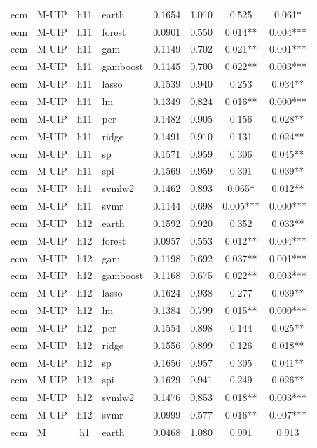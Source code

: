 \begin{ThreePartTable}
\begin{longtable}[t]{llclcccc}
\addlinespace
ecm & M-UIP & h11 & earth & 0.1654 & 1.010 & 0.525 & 0.061*\\
ecm & M-UIP & h11 & forest & 0.0901 & 0.550 & 0.014** & 0.004***\\
ecm & M-UIP & h11 & gam & 0.1149 & 0.702 & 0.021** & 0.001***\\
ecm & M-UIP & h11 & gamboost & 0.1145 & 0.700 & 0.022** & 0.003***\\
ecm & M-UIP & h11 & lasso & 0.1539 & 0.940 & 0.253 & 0.034**\\
ecm & M-UIP & h11 & lm & 0.1349 & 0.824 & 0.016** & 0.000***\\
ecm & M-UIP & h11 & pcr & 0.1482 & 0.905 & 0.156 & 0.028**\\
ecm & M-UIP & h11 & ridge & 0.1491 & 0.910 & 0.131 & 0.024**\\
ecm & M-UIP & h11 & sp & 0.1571 & 0.959 & 0.306 & 0.045**\\
ecm & M-UIP & h11 & spi & 0.1569 & 0.959 & 0.301 & 0.039**\\
ecm & M-UIP & h11 & svmlw2 & 0.1462 & 0.893 & 0.065* & 0.012**\\
ecm & M-UIP & h11 & svmr & 0.1144 & 0.698 & 0.005*** & 0.000***\\
\addlinespace
ecm & M-UIP & h12 & earth & 0.1592 & 0.920 & 0.352 & 0.033**\\
ecm & M-UIP & h12 & forest & 0.0957 & 0.553 & 0.012** & 0.004***\\
ecm & M-UIP & h12 & gam & 0.1198 & 0.692 & 0.037** & 0.001***\\
ecm & M-UIP & h12 & gamboost & 0.1168 & 0.675 & 0.022** & 0.003***\\
ecm & M-UIP & h12 & lasso & 0.1624 & 0.938 & 0.277 & 0.039**\\
ecm & M-UIP & h12 & lm & 0.1384 & 0.799 & 0.015** & 0.000***\\
ecm & M-UIP & h12 & pcr & 0.1554 & 0.898 & 0.144 & 0.025**\\
ecm & M-UIP & h12 & ridge & 0.1556 & 0.899 & 0.126 & 0.018**\\
ecm & M-UIP & h12 & sp & 0.1656 & 0.957 & 0.305 & 0.041**\\
ecm & M-UIP & h12 & spi & 0.1629 & 0.941 & 0.249 & 0.026**\\
ecm & M-UIP & h12 & svmlw2 & 0.1476 & 0.853 & 0.018** & 0.003***\\
ecm & M-UIP & h12 & svmr & 0.0999 & 0.577 & 0.016** & 0.007***\\
\addlinespace
ecm & M & h1 & earth & 0.0468 & 1.080 & 0.991 & 0.913\\

\end{longtable}
\end{ThreePartTable}
